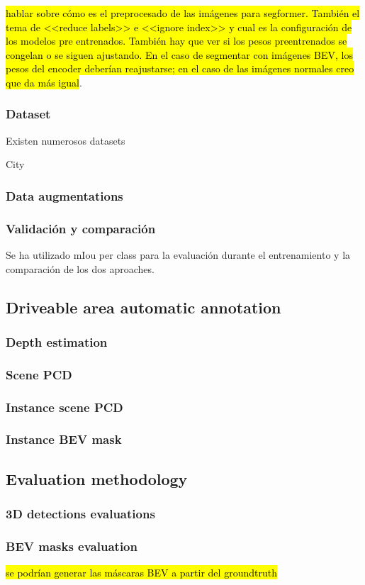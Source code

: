 \hl{hablar sobre cómo es el preprocesado de las imágenes para segformer. También el tema de <<reduce labels>> e <<ignore index>> y cual es la configuración de los modelos pre entrenados. También hay que ver si los pesos preentrenados se congelan o se siguen ajustando. En el caso de segmentar con imágenes BEV, los pesos del encoder deberían reajustarse; en el caso de las imágenes normales creo que da más igual}.

\subsubsection{Dataset}
Existen numerosos datasets 

City

\subsubsection{Data augmentations}
\subsubsection{Validación y comparación}
Se ha utilizado mIou per class para la evaluación durante el entrenamiento y la comparación de los dos aproaches.


\subsection{ Driveable area automatic annotation}
\label{aplicacion}

\subsubsection{Depth estimation}
\subsubsection{Scene PCD}
\subsubsection{Instance scene PCD}
\subsubsection{Instance BEV mask}

\subsection{Evaluation methodology}
\label{evaluacion}

\subsubsection{3D detections evaluations}
\subsubsection{BEV masks evaluation}
\hl{se podrían generar las máscaras BEV a partir del groundtruth}


